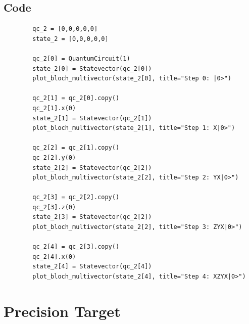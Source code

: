 \documentclass{exam}
\begin{document}
    \subsection{Code}
    \begin{verbatim}
        qc_2 = [0,0,0,0,0]
        state_2 = [0,0,0,0,0]

        qc_2[0] = QuantumCircuit(1)
        state_2[0] = Statevector(qc_2[0])
        plot_bloch_multivector(state_2[0], title="Step 0: |0>")

        qc_2[1] = qc_2[0].copy()
        qc_2[1].x(0)
        state_2[1] = Statevector(qc_2[1])
        plot_bloch_multivector(state_2[1], title="Step 1: X|0>")

        qc_2[2] = qc_2[1].copy()
        qc_2[2].y(0)
        state_2[2] = Statevector(qc_2[2])
        plot_bloch_multivector(state_2[2], title="Step 2: YX|0>")

        qc_2[3] = qc_2[2].copy()
        qc_2[3].z(0)
        state_2[3] = Statevector(qc_2[2])
        plot_bloch_multivector(state_2[2], title="Step 3: ZYX|0>")

        qc_2[4] = qc_2[3].copy()
        qc_2[4].x(0)
        state_2[4] = Statevector(qc_2[4])
        plot_bloch_multivector(state_2[4], title="Step 4: XZYX|0>")
    \end{verbatim}

    \section{Precision Target}
\end{document}
